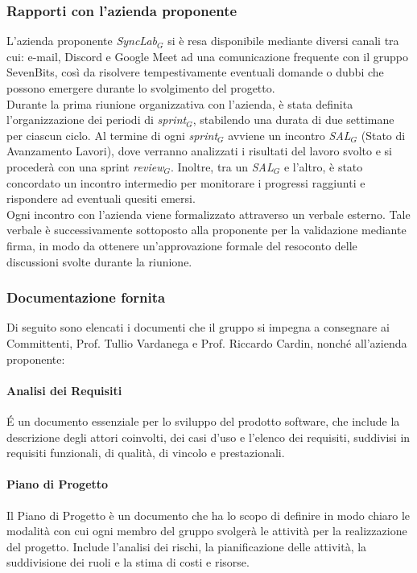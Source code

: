 \subsubsection{Rapporti con l'azienda proponente}
L'azienda proponente \textit{SyncLab}$_G$ si è resa disponibile mediante diversi canali tra cui: e-mail, Discord e Google Meet ad una comunicazione frequente con il gruppo SevenBits, così da risolvere tempestivamente eventuali domande o dubbi che possono emergere durante lo svolgimento del progetto.\\
Durante la prima riunione organizzativa con l'azienda, è stata definita l'organizzazione dei periodi di \textit{sprint}$_G$, stabilendo una durata di due settimane per ciascun ciclo. Al termine di ogni \textit{sprint}$_G$ avviene un incontro \textit{SAL}$_G$ (Stato di Avanzamento Lavori), dove verranno analizzati i risultati del lavoro svolto e si procederà con una sprint \textit{review}$_G$. Inoltre, tra un \textit{SAL}$_G$ e l'altro, è stato concordato un incontro intermedio per monitorare i progressi raggiunti e rispondere ad eventuali quesiti emersi.\\
Ogni incontro con l'azienda viene formalizzato attraverso un verbale esterno. Tale verbale è successivamente sottoposto alla proponente per la validazione mediante firma, in modo da ottenere un'approvazione formale del resoconto delle discussioni svolte durante la riunione.\\

\subsubsection{Documentazione fornita}
Di seguito sono elencati i documenti che il gruppo si impegna a consegnare ai Committenti, Prof. Tullio Vardanega e Prof. Riccardo Cardin, nonché all'azienda proponente:\\

    \paragraph{Analisi dei Requisiti}
    \'E un documento essenziale per lo sviluppo del prodotto software, che include la descrizione degli attori coinvolti, dei casi d’uso e l’elenco dei requisiti, suddivisi in requisiti funzionali, di qualità, di vincolo e prestazionali.\\

    \paragraph{Piano di Progetto}
    Il Piano di Progetto è un documento che ha lo scopo di definire in modo chiaro le modalità con cui ogni membro del gruppo svolgerà le attività per la realizzazione del progetto. Include l'analisi dei rischi, la pianificazione delle attività, la suddivisione dei ruoli e la stima di costi e risorse.\\

